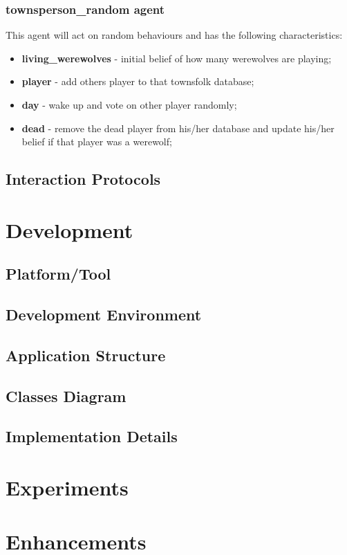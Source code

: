 \documentclass{article}
\begin{document}
\subsubsection{townsperson\_random agent}
This agent will act on random behaviours and has the following characteristics:
\begin{itemize}
	\item \textbf{living_werewolves} - initial belief of how many werewolves are playing; 
	\item \textbf{player} - add others player to that townsfolk database;
	\item \textbf{day} - wake up and vote on other player randomly;
	\item \textbf{dead} - remove the dead player from his/her database and update his/her belief if that player was a werewolf;
\end{itemize}

\subsection{Interaction Protocols}
\section{Development}
\subsection{Platform/Tool}
\subsection{Development Environment}
\subsection{Application Structure}
\subsection{Classes Diagram}
\subsection{Implementation Details}
\section{Experiments}
\section{Enhancements}
\end{document}
